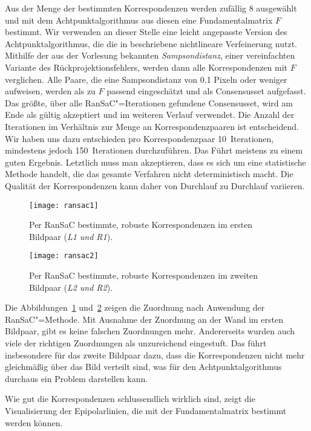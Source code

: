 Aus der Menge der bestimmten Korrespondenzen werden zufällig 8 ausgewählt und mit dem Achtpunktalgorithmus aus diesen eine Fundamentalmatrix $F$ bestimmt. Wir verwenden an dieser Stelle eine leicht angepasste Version des Achtpunktalgorithmus, die die in \cite[S. 393]{Ma} beschriebene nichtlineare Verfeinerung nutzt. Mithilfe der aus der Vorlesung bekannten \textit{Sampsondistanz}, einer vereinfachten Variante des Rückprojektionsfehlers, werden dann alle Korrespondenzen mit $F$ verglichen. Alle Paare, die eine Sampsondistanz von 0.1 Pixeln oder weniger aufweisen, werden als zu $F$ passend eingeschätzt und als Consensusset aufgefasst. Das größte, über alle RanSaC"=Iterationen gefundene Consensusset, wird am Ende als gültig akzeptiert und im weiteren Verlauf verwendet. Die Anzahl der Iterationen im Verhältnis zur Menge an Korrespondenzpaaren ist entscheidend. Wir haben uns dazu entschieden pro Korrespondenzpaar 10~Iterationen, mindestens jedoch 150~Iterationen durchzuführen. Das Führt meistens zu einem guten Ergebnis. Letztlich muss man akzeptieren, dass es sich um eine statistische Methode handelt, die das gesamte Verfahren nicht deterministisch macht. Die Qualität der Korrespondenzen kann daher von Durchlauf zu Durchlauf variieren.

\begin{figure}[!hp]
	\centering
	\texttt{[image: ransac1]}
	\caption{Per RanSaC bestimmte, robuste Korrespondenzen im ersten Bildpaar (\textit{L1 und R1}).}
	\label{fig:ransac1}
\end{figure}

\begin{figure}[!hp]
	\centering
	\texttt{[image: ransac2]}
	\caption{Per RanSaC bestimmte, robuste Korrespondenzen im zweiten Bildpaar (\textit{L2 und R2}).}
	\label{fig:ransac2}
\end{figure}

Die Abbildungen~\ref{fig:ransac1} und~\ref{fig:ransac2} zeigen die Zuordnung nach Anwendung der RanSaC"=Methode. Mit Ausnahme der Zuordnung an der Wand im ersten Bildpaar, gibt es keine falschen Zuordnungen mehr. Andererseits wurden auch viele der richtigen Zuordnungen als unzureichend eingestuft. Das führt insbesondere für das zweite Bildpaar dazu, dass die Korrespondenzen nicht mehr gleichmäßig über das Bild verteilt sind, was für den Achtpunktalgorithmus durchaus ein Problem darstellen kann.

Wie gut die Korrespondenzen schlussendlich wirklich sind, zeigt die Visualisierung der Epipolarlinien, die mit der Fundamentalmatrix bestimmt werden können.


